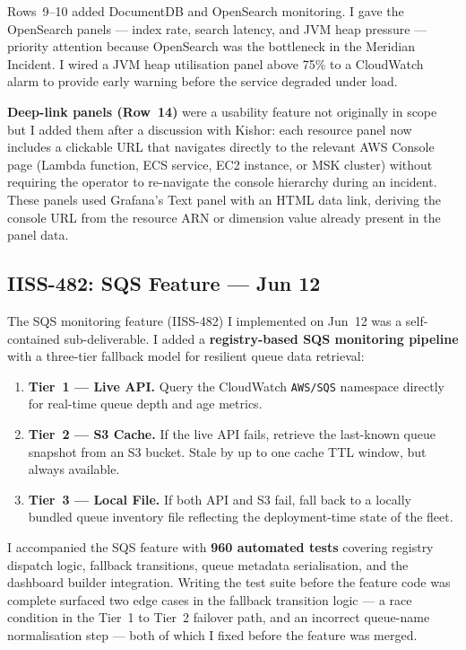 Rows~9--10 added DocumentDB and OpenSearch monitoring. I gave the OpenSearch panels ---
index rate, search latency, and JVM heap pressure --- priority attention
because OpenSearch was the bottleneck in the Meridian Incident. I wired a JVM heap
utilisation panel above 75\% to a CloudWatch alarm to provide early
warning before the service degraded under load.

\textbf{Deep-link panels (Row~14)} were a usability feature not originally in
scope but I added them after a discussion with Kishor: each resource panel now includes
a clickable URL that navigates directly to the relevant AWS Console page
(Lambda function, ECS service, EC2 instance, or MSK cluster) without requiring
the operator to re-navigate the console hierarchy during an incident. These
panels used Grafana's Text panel with an HTML data link, deriving the console
URL from the resource ARN or dimension value already present in the panel data.

\subsection{IISS-482: SQS Feature --- Jun 12}

The SQS monitoring feature (IISS-482) I implemented on Jun~12 was a
self-contained sub-deliverable. I added a \textbf{registry-based
SQS monitoring pipeline} with a three-tier fallback model for resilient queue
data retrieval:

\begin{enumerate}
    \item \textbf{Tier~1 --- Live API.} Query the CloudWatch \texttt{AWS/SQS}
          namespace directly for real-time queue depth and age metrics.
    \item \textbf{Tier~2 --- S3 Cache.} If the live API fails, retrieve the
          last-known queue snapshot from an S3 bucket. Stale by up to one cache
          TTL window, but always available.
    \item \textbf{Tier~3 --- Local File.} If both API and S3 fail, fall back to
          a locally bundled queue inventory file reflecting the deployment-time
          state of the fleet.
\end{enumerate}

I accompanied the SQS feature with \textbf{960 automated tests} covering registry
dispatch logic, fallback transitions, queue metadata serialisation, and the
dashboard builder integration. Writing the test suite before the feature code
was complete surfaced two edge cases in the fallback transition logic --- a
race condition in the Tier~1 to Tier~2 failover path, and an incorrect
queue-name normalisation step --- both of which I fixed before the feature
was merged.

